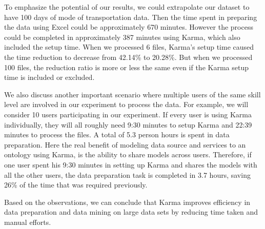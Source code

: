 To emphasize the potential of our results, we could extrapolate our dataset to have 100 days of mode of transportation data. Then the time spent in preparing the data using Excel could be approximately 670 minutes. However the process could be completed in approximately 387 minutes using Karma, which also included the setup time. When we processed 6 files, Karma's setup time caused the time reduction to decrease from 42.14\% to 20.28\%. But when we processed 100 files, the reduction ratio is more or less the same even if the Karma setup time is included or excluded. 

We also discuss another important scenario where multiple users of the same skill level are involved in our experiment to process the data. For example, we will consider 10 users participating in our experiment. If every user is using Karma individually, they will all roughly need 9:30 minutes to setup Karma and 22:39 minutes to process the files. A total of 5.3 person hours is spent in data preparation. Here the real benefit of modeling data source and services to an ontology using Karma, is the ability to share models across users. Therefore, if one user spent his 9:30 minutes in setting up Karma and shares the models with all the other users, the data preparation task is completed in 3.7 hours, saving 26\% of the time that was required previously. 

Based on the observations, we can conclude that Karma improves efficiency in data preparation and data mining on large data sets by reducing time taken and manual efforts.



